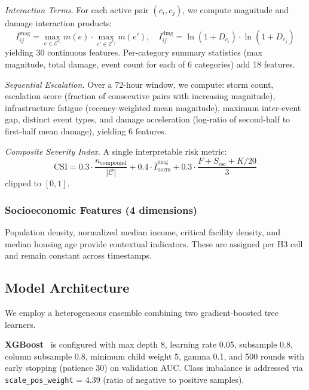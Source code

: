 \documentclass[conference]{IEEEtran}
\begin{document}
\textit{Interaction Terms.} For each active pair $(c_i, c_j)$, we compute magnitude and damage interaction products:
\begin{equation}\label{eq:interact}
    I^{\text{mag}}_{ij} = \max_{e \in \mathcal{E}^{c_i}} m(e) \cdot \max_{e' \in \mathcal{E}^{c_j}} m(e'), \quad
    I^{\text{dmg}}_{ij} = \ln(1{+}D_{c_i}) \cdot \ln(1{+}D_{c_j})
\end{equation}
yielding 30 continuous features. Per-category summary statistics (max magnitude, total damage, event count for each of 6 categories) add 18 features.

\textit{Sequential Escalation.} Over a 72-hour window, we compute: storm count, escalation score (fraction of consecutive pairs with increasing magnitude), infrastructure fatigue (recency-weighted mean magnitude), maximum inter-event gap, distinct event types, and damage acceleration (log-ratio of second-half to first-half mean damage), yielding 6 features.

\textit{Composite Severity Index.} A single interpretable risk metric:
\begin{equation}\label{eq:csi}
    \text{CSI} = 0.3 \cdot \frac{n_{\text{compound}}}{|\mathcal{C}|} + 0.4 \cdot \bar{I}^{\text{mag}}_{\text{norm}} + 0.3 \cdot \frac{F + S_{\text{esc}} + K/20}{3}
\end{equation}
clipped to $[0,1]$.

\subsubsection{Socioeconomic Features (4 dimensions)}
Population density, normalized median income, critical facility density, and median housing age provide contextual indicators. These are assigned per H3 cell and remain constant across timestamps.

\subsection{Model Architecture}

We employ a heterogeneous ensemble combining two gradient-boosted tree learners.

\textbf{XGBoost}~\cite{chen2016xgboost} is configured with max depth 8, learning rate 0.05, subsample 0.8, column subsample 0.8, minimum child weight 5, gamma 0.1, and 500 rounds with early stopping (patience 30) on validation AUC. Class imbalance is addressed via \texttt{scale\_pos\_weight} = 4.39 (ratio of negative to positive samples).
\end{document}
